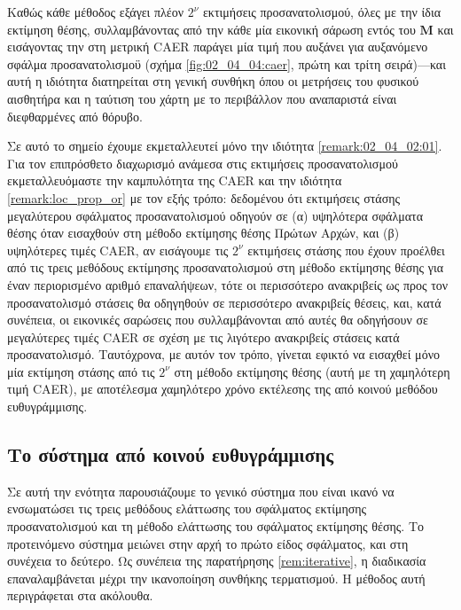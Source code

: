 Καθώς κάθε μέθοδος εξάγει πλέον $2^\nu$ εκτιμήσεις προσανατολισμού, όλες με την
ίδια εκτίμηση θέσης, συλλαμβάνοντας από την κάθε μία εικονική σάρωση εντός του
$\bm{M}$ και εισάγοντας την στη μετρική CAER παράγει μία τιμή που αυξάνει για
αυξανόμενο σφάλμα προσανατολισμοϋ (σχήμα \ref{fig:02_04_04:caer}, πρώτη και
τρίτη σειρά)---και αυτή η ιδιότητα διατηρείται στη γενική συνθήκη όπου οι
μετρήσεις του φυσικού αισθητήρα και η ταύτιση του χάρτη με το περιβάλλον που
αναπαριστά είναι διεφθαρμένες από θόρυβο.

Σε αυτό το σημείο έχουμε εκμεταλλευτεί μόνο την ιδιότητα
\ref{remark:02_04_02:01}. Για τον επιπρόσθετο διαχωρισμό ανάμεσα στις
εκτιμήσεις προσανατολισμού εκμεταλλευόμαστε την καμπυλότητα της CAER και την
ιδιότητα \ref{remark:loc_prop_or} με τον εξής τρόπο: δεδομένου ότι εκτιμήσεις
στάσης μεγαλύτερου σφάλματος  προσανατολισμού οδηγούν σε (α) υψηλότερα σφάλματα
θέσης όταν εισαχθούν στη μέθοδο εκτίμησης θέσης Πρώτων Αρχών, και (β)
υψηλότερες τιμές CAER, αν εισάγουμε τις $2^\nu$ εκτιμήσεις στάσης που έχουν
προέλθει από τις τρεις μεθόδους εκτίμησης προσανατολισμού στη μέθοδο εκτίμησης
θέσης για έναν περιορισμένο αριθμό επαναλήψεων, τότε οι περισσότερο ανακριβείς
ως προς τον προσανατολισμό στάσεις θα οδηγηθούν σε περισσότερο ανακριβείς
θέσεις, και, κατά συνέπεια, οι εικονικές σαρώσεις που συλλαμβάνονται από αυτές
θα οδηγήσουν σε μεγαλύτερες τιμές CAER σε σχέση με τις λιγότερο ανακριβείς
στάσεις κατά προσανατολισμό. Ταυτόχρονα, με αυτόν τον τρόπο, γίνεται εφικτό
να εισαχθεί μόνο μία εκτίμηση στάσης από τις $2^\nu$ στη μέθοδο εκτίμησης
θέσης (αυτή με τη χαμηλότερη τιμή CAER), με αποτέλεσμα χαμηλότερο χρόνο
εκτέλεσης της από κοινού μεθόδου ευθυγράμμισης.


\begin{figure}[!h]\centering
  
  \caption{}
  \label{fig:02_04_04:inner_rotation_system}
\end{figure}






\subsection{Το σύστημα από κοινού ευθυγράμμισης}
\label{subsection:02_04_04:02}


Σε αυτή την ενότητα παρουσιάζουμε το γενικό σύστημα που είναι ικανό να
ενσωματώσει τις τρεις μεθόδους ελάττωσης του σφάλματος εκτίμησης
προσανατολισμού και τη μέθοδο ελάττωσης του σφάλματος εκτίμησης θέσης.  Το
προτεινόμενο σύστημα μειώνει στην αρχή το πρώτο είδος σφάλματος, και στη
συνέχεια το δεύτερο. Ως συνέπεια της παρατήρησης \ref{rem:iterative}, η
διαδικασία επαναλαμβάνεται μέχρι την ικανοποίηση συνθήκης τερματισμού. Η
μέθοδος αυτή περιγράφεται στα ακόλουθα.


